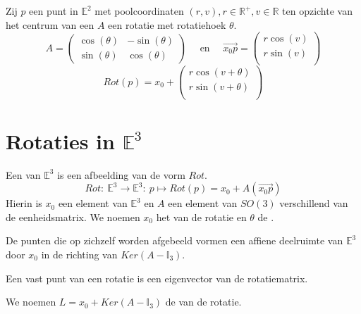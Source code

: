 \documentclass[main.tex]{subfiles}
\begin{document}
\begin{st}
  Zij $p$ een punt in $\mathbb{E}^{2}$ met poolcoordinaten $(r,v), r\in \mathbb{R}^{+}, v\in \mathbb{R}$ ten opzichte van het centrum van een $A$ een rotatie met rotatiehoek $\theta$.
  \[
  A = 
  \begin{pmatrix}
    \cos(\theta) & -\sin(\theta)\\
    \sin(\theta) & \cos(\theta)
  \end{pmatrix}
  \quad\text{ en }\quad
  \overrightarrow{x_{0}p} = 
  \begin{pmatrix}
    r\cos(v)\\ r\sin(v)\\
  \end{pmatrix}
  \]
  \[ Rot(p) = x_{0} +
  \begin{pmatrix}
    r\cos(v+\theta)\\ r\sin(v+\theta)\\
  \end{pmatrix}
  \]
\end{st}
\section{Rotaties in $\mathbb{E}^{3}$}
\label{sec:roties-in-e3}

\begin{de}
  Een  van $\mathbb{E}^{3}$ is een afbeelding van de vorm $Rot$.
  \[ Rot:\ \mathbb{E}^{3} \rightarrow \mathbb{E}^{3}:\ p \mapsto Rot(p) = x_{0} + A(\overrightarrow{x_{0}p}) \]
  Hierin is $x_{0}$ een element van $\mathbb{E}^{3}$ en $A$ een element van $SO(3)$ verschillend van de eenheidsmatrix.
  We noemen $x_{0}$ het  van de rotatie en $\theta$ de .
\end{de}


\begin{st}
  De punten die op zichzelf worden afgebeeld vormen een affiene deelruimte van $\mathbb{E}^{3}$ door $x_{0}$ in de richting van $Ker(A-\mathbb{I}_{3})$.
\end{st}

\begin{st}
  Een vast punt van een rotatie is een eigenvector van de rotatiematrix.
\end{st}

\begin{de}
  We noemen $L = x_{0} + Ker(A-\mathbb{I}_{3})$ de  van de rotatie.
\end{de}
\end{document}
